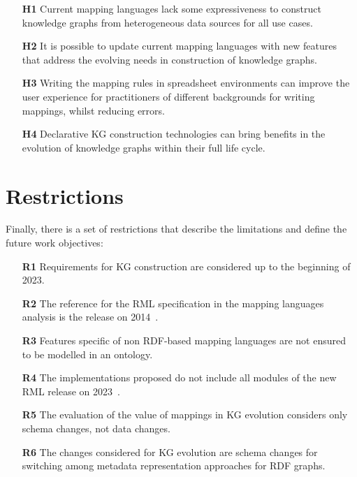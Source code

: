\begin{enumerate}
    \item[\textbf{H1}] Current mapping languages lack some expressiveness to construct knowledge graphs from heterogeneous data sources for all use cases.
    \item[\textbf{H2}] It is possible to update  current mapping languages with new features that address the evolving needs in construction of knowledge graphs.
    \item[\textbf{H3}] Writing the mapping rules in spreadsheet environments can improve the user experience for practitioners of different backgrounds for writing mappings, whilst reducing errors. 
    \item[\textbf{H4}] Declarative KG construction technologies can bring benefits in the evolution of knowledge graphs within their full life cycle.
\end{enumerate}


\section{Restrictions}
\label{sec:chp3-restrictions}

Finally, there is a set of restrictions that describe the limitations and define the future work objectives:

\begin{enumerate}
    \item[\textbf{R1}] Requirements for KG construction are considered up to the beginning of 2023.
    \item[\textbf{R2}] The reference for the RML specification in the mapping languages analysis is the release on 2014~\parencite{Dimou2014rml}.
    \item[\textbf{R3}] Features specific of non RDF-based mapping languages are not ensured to be modelled in an ontology.
    \item[\textbf{R4}] The implementations proposed do not include all modules of the new RML release on 2023~\parencite{iglesias2023rml}. 
    \item[\textbf{R5}] The evaluation of the value of mappings in KG evolution considers only schema changes, not data changes.
    \item[\textbf{R6}] The changes considered for KG evolution are schema changes for switching among metadata representation approaches for RDF graphs.
\end{enumerate}


